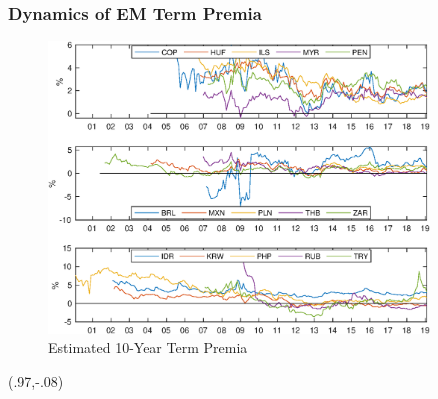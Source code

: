\documentclass[12pt, aspectratio=169, xcolor=dvipsnames]{beamer}  %
\begin{document}
\begin{frame}[label=tp_10yrA]
	\frametitle{Dynamics of EM Term Premia}
	\begin{figure}[!htbp]
		\begin{center}
			\includegraphics[trim={0 8.90cm 0 0}, clip, width=0.9\textwidth, height=0.65\textheight]{../Figures/Temp/temp_tp10yrEM}
			\par\end{center}
		\caption{Estimated 10-Year Term Premia}\label{fig:tp_10yrA}
	\end{figure}
	\begin{textblock*}{3cm}(.97\textwidth,-.08\textheight)
		\hyperlink{tp_10yrB}{}
	\end{textblock*}
\end{frame}
\end{document}
